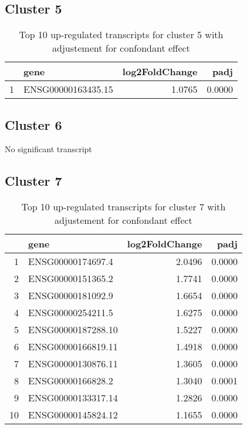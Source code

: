 \documentclass{article}
\begin{document}
\subsection{Cluster 5 }
\begin{table}[H]
\centering
\begin{tabularx}{\textwidth}{rlrr}
  \hline
 & gene & log2FoldChange & padj \\ 
  \hline
1 & ENSG00000163435.15 & 1.0765 & 0.0000 \\ 
   \hline
\end{tabularx}
\caption{Top 10 up-regulated transcripts for cluster 5 with adjustement for confondant effect} 
\label{tab:q3_1_conf_5}
\end{table}
\subsection{Cluster 6 }
No significant transcript
\subsection{Cluster 7 }
\begin{table}[H]
\centering
\begin{tabularx}{\textwidth}{rlrr}
  \hline
 & gene & log2FoldChange & padj \\ 
  \hline
1 & ENSG00000174697.4 & 2.0496 & 0.0000 \\ 
  2 & ENSG00000151365.2 & 1.7741 & 0.0000 \\ 
  3 & ENSG00000181092.9 & 1.6654 & 0.0000 \\ 
  4 & ENSG00000254211.5 & 1.6275 & 0.0000 \\ 
  5 & ENSG00000187288.10 & 1.5227 & 0.0000 \\ 
  6 & ENSG00000166819.11 & 1.4918 & 0.0000 \\ 
  7 & ENSG00000130876.11 & 1.3605 & 0.0000 \\ 
  8 & ENSG00000166828.2 & 1.3040 & 0.0001 \\ 
  9 & ENSG00000133317.14 & 1.2826 & 0.0000 \\ 
  10 & ENSG00000145824.12 & 1.1655 & 0.0000 \\ 
   \hline
\end{tabularx}
\caption{Top 10 up-regulated transcripts for cluster 7 with adjustement for confondant effect} 
\label{tab:q3_1_conf_7}
\end{table}
\end{document}
